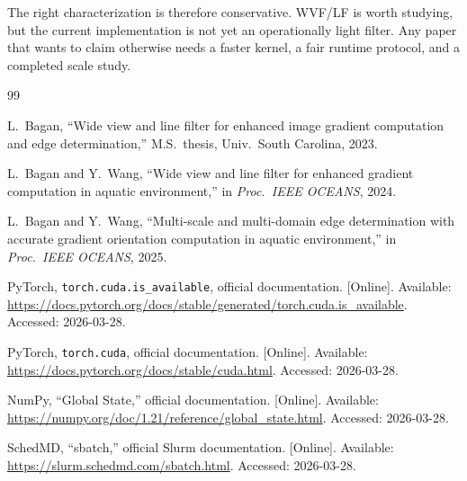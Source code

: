 \documentclass[conference]{IEEEtran}
\begin{document}
The right characterization is therefore conservative. WVF/LF is worth studying, but the current implementation is not yet an operationally light filter. Any paper that wants to claim otherwise needs a faster kernel, a fair runtime protocol, and a completed scale study.

\begin{thebibliography}{99}

L.~Bagan, ``Wide view and line filter for enhanced image gradient computation and edge determination,'' M.S.\ thesis, Univ.\ South Carolina, 2023.

L.~Bagan and Y.~Wang, ``Wide view and line filter for enhanced gradient computation in aquatic environment,'' in \textit{Proc.\ IEEE OCEANS}, 2024.

L.~Bagan and Y.~Wang, ``Multi-scale and multi-domain edge determination with accurate gradient orientation computation in aquatic environment,'' in \textit{Proc.\ IEEE OCEANS}, 2025.

PyTorch, \texttt{torch.cuda.is\_available}, official documentation. [Online]. Available: \url{https://docs.pytorch.org/docs/stable/generated/torch.cuda.is_available}. Accessed: 2026-03-28.

PyTorch, \texttt{torch.cuda}, official documentation. [Online]. Available: \url{https://docs.pytorch.org/docs/stable/cuda.html}. Accessed: 2026-03-28.

NumPy, ``Global State,'' official documentation. [Online]. Available: \url{https://numpy.org/doc/1.21/reference/global_state.html}. Accessed: 2026-03-28.

SchedMD, ``sbatch,'' official Slurm documentation. [Online]. Available: \url{https://slurm.schedmd.com/sbatch.html}. Accessed: 2026-03-28.

\end{thebibliography}
\end{document}
